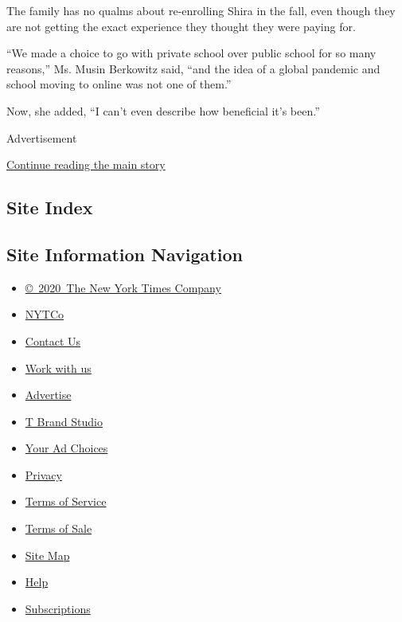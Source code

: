 The family has no qualms about re-enrolling Shira in the fall, even
though they are not getting the exact experience they thought they were
paying for.

``We made a choice to go with private school over public school for so
many reasons,'' Ms. Musin Berkowitz said, ``and the idea of a global
pandemic and school moving to online was not one of them.''

Now, she added, ``I can't even describe how beneficial it's been.''

Advertisement

\protect\hyperlink{after-bottom}{Continue reading the main story}

\hypertarget{site-index}{%
\subsection{Site Index}\label{site-index}}

\hypertarget{site-information-navigation}{%
\subsection{Site Information
Navigation}\label{site-information-navigation}}

\begin{itemize}
\tightlist
\item
  \href{https://help.nytimes.com/hc/en-us/articles/115014792127-Copyright-notice}{©~2020~The
  New York Times Company}
\end{itemize}

\begin{itemize}
\tightlist
\item
  \href{https://www.nytco.com/}{NYTCo}
\item
  \href{https://help.nytimes.com/hc/en-us/articles/115015385887-Contact-Us}{Contact
  Us}
\item
  \href{https://www.nytco.com/careers/}{Work with us}
\item
  \href{https://nytmediakit.com/}{Advertise}
\item
  \href{http://www.tbrandstudio.com/}{T Brand Studio}
\item
  \href{https://www.nytimes.com/privacy/cookie-policy\#how-do-i-manage-trackers}{Your
  Ad Choices}
\item
  \href{https://www.nytimes.com/privacy}{Privacy}
\item
  \href{https://help.nytimes.com/hc/en-us/articles/115014893428-Terms-of-service}{Terms
  of Service}
\item
  \href{https://help.nytimes.com/hc/en-us/articles/115014893968-Terms-of-sale}{Terms
  of Sale}
\item
  \href{https://spiderbites.nytimes.com}{Site Map}
\item
  \href{https://help.nytimes.com/hc/en-us}{Help}
\item
  \href{https://www.nytimes.com/subscription?campaignId=37WXW}{Subscriptions}
\end{itemize}
